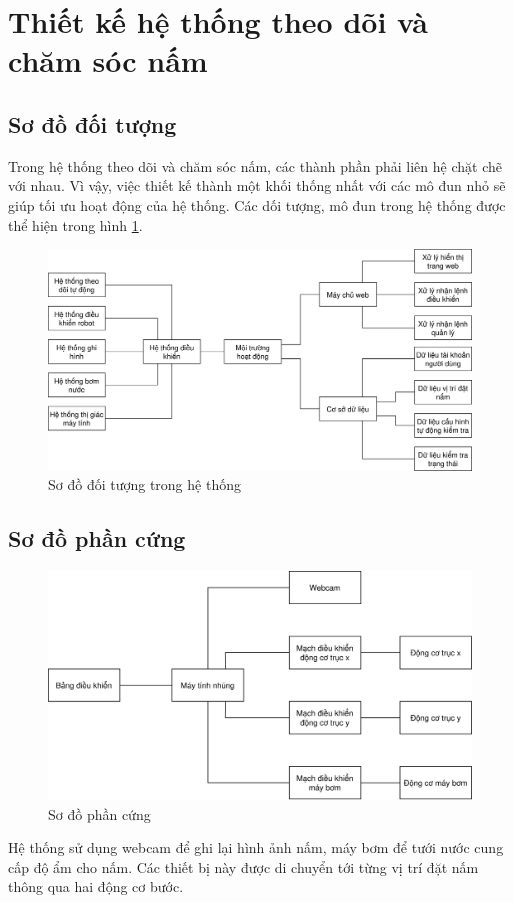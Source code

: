 \section{Thiết kế hệ thống theo dõi và chăm sóc nấm}

\subsection{Sơ đồ đối tượng}
Trong hệ thống theo dõi và chăm sóc nấm, các thành phần phải liên hệ chặt chẽ với nhau. Vì vậy, việc thiết kế thành một khối thống nhất với các mô đun nhỏ sẽ giúp tối ưu hoạt động của hệ thống. Các dối tượng, mô đun trong hệ thống được thể hiện trong hình \ref{fig:diagram-objects}.

\begin{figure}[h]
	\centering
	\includegraphics[width=1\linewidth]{images/diagram-objects}
	\caption{Sơ đồ đối tượng trong hệ thống}
	\label{fig:diagram-objects}
\end{figure}

\subsection{Sơ đồ phần cứng}

\begin{figure}[h]
	\centering
	\includegraphics[width=0.7\linewidth]{images/hardware}
	\caption{Sơ đồ phần cứng}
	\label{fig:hardware}
\end{figure}
Hệ thống sử dụng webcam để ghi lại hình ảnh nấm, máy bơm để tưới nước cung cấp độ ẩm cho nấm. Các thiết bị này được di chuyển tới từng vị trí đặt nấm thông qua hai động cơ bước.

